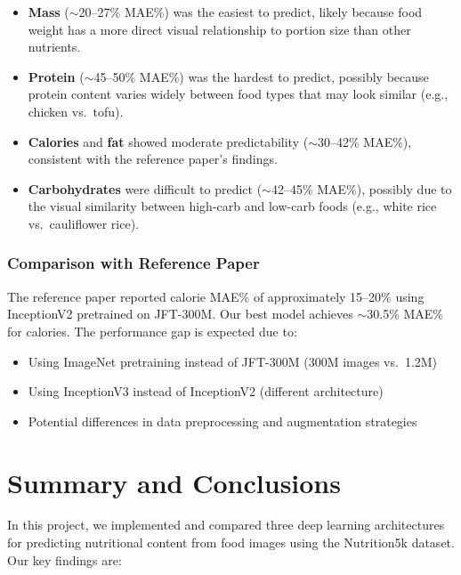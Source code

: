 \documentclass[11pt,a4paper]{article}
\begin{document}
\begin{itemize}
  \item \textbf{Mass} ($\sim$20--27\% MAE\%) was the easiest to predict, likely because food weight has a more direct visual relationship to portion size than other nutrients.
  \item \textbf{Protein} ($\sim$45--50\% MAE\%) was the hardest to predict, possibly because protein content varies widely between food types that may look similar (e.g., chicken vs.\ tofu).
  \item \textbf{Calories} and \textbf{fat} showed moderate predictability ($\sim$30--42\% MAE\%), consistent with the reference paper's findings.
  \item \textbf{Carbohydrates} were difficult to predict ($\sim$42--45\% MAE\%), possibly due to the visual similarity between high-carb and low-carb foods (e.g., white rice vs.\ cauliflower rice).
\end{itemize}

\subsubsection{Comparison with Reference Paper}

The reference paper \cite{thames2021} reported calorie MAE\% of approximately 15--20\% using InceptionV2 pretrained on JFT-300M. Our best model achieves $\sim$30.5\% MAE\% for calories. The performance gap is expected due to:
\begin{itemize}
  \item Using ImageNet pretraining instead of JFT-300M (300M images vs.\ 1.2M)
  \item Using InceptionV3 instead of InceptionV2 (different architecture)
  \item Potential differences in data preprocessing and augmentation strategies
\end{itemize}

\section{Summary and Conclusions}
\label{sec:conclusion}

In this project, we implemented and compared three deep learning architectures for predicting nutritional content from food images using the Nutrition5k dataset. Our key findings are:
\end{document}
